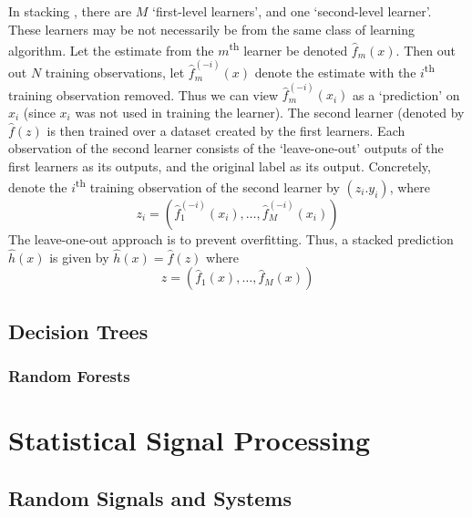 \documentclass[11pt]{report} %
\begin{document}
In stacking \cite{Hastie2009, Zhou2012}, there are $M$ `first-level learners', and one `second-level learner'. These learners may be not necessarily be from the same class of learning algorithm. Let the estimate from the $m$\textsuperscript{th} learner be denoted $\hat{f}_{m}\left(x\right)$. Then out out $N$ training observations, let $\hat{f}_{m}^{\left(-i\right)}\left(x\right)$ denote the estimate with the $i$\textsuperscript{th} training observation removed. Thus we can view $\hat{f}_{m}^{\left(-i\right)}\left(x_{i}\right)$ as a `prediction' on $x_{i}$ (since $x_{i}$ was not used in training the learner). The second learner (denoted by $\hat{f}\left(z\right)$ is then trained over a dataset created by the first learners. Each observation of the second learner consists of the `leave-one-out' outputs of the first learners as its outputs, and the original label as its output. Concretely, denote the $i$\textsuperscript{th} training observation of the second learner by $\left(z_{i}. y_{i}\right)$, where
\begin{equation}
z_{i} = \left(\hat{f}_{1}^{\left(-i\right)}\left(x_{i}\right), \dots, \hat{f}_{M}^{\left(-i\right)}\left(x_{i}\right)\right)
\end{equation}
The leave-one-out approach is to prevent overfitting. Thus, a stacked prediction $\hat{h}\left(x\right)$ is given by $\hat{h}\left(x\right) = \hat{f}\left(z\right)$ where
\begin{equation}
z = \left(\hat{f}_{1}\left(x\right), \dots, \hat{f}_{M}\left(x\right)\right)
\end{equation}

\section{Decision Trees}

\subsection{Random Forests}



\chapter{Statistical Signal Processing}

\section{Random Signals and Systems}
\end{document}
